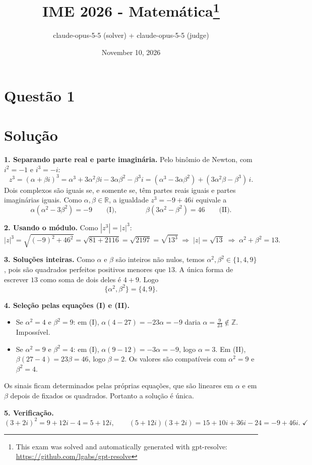 \documentclass{article}%
\title{IME 2026 - Matemática\thanks{This exam was solved and automatically generated with gpt-resolve: \url{https://github.com/lgabs/gpt-resolve}}}%
\author{claude{-}opus{-}5{-}5 (solver) + claude{-}opus{-}5{-}5 (judge)}%
\date{November 10, 2026}%
\begin{document}
%
\normalsize%
\maketitle%
\section*{Questão 1}

\section*{Solução}

\textbf{1. Separando parte real e parte imaginária.} Pelo binômio de Newton, com $i^2=-1$ e $i^3=-i$:
\[
z^3=(\alpha+\beta i)^3=\alpha^3+3\alpha^2\beta i-3\alpha\beta^2-\beta^3 i=(\alpha^3-3\alpha\beta^2)+(3\alpha^2\beta-\beta^3)\,i .
\]
Dois complexos são iguais se, e somente se, têm partes reais iguais e partes imaginárias iguais. Como $\alpha,\beta\in\mathbb{R}$, a igualdade $z^3=-9+46i$ equivale a
\[
\alpha(\alpha^2-3\beta^2)=-9 \qquad \text{(I)}, \qquad\qquad \beta(3\alpha^2-\beta^2)=46 \qquad \text{(II)}.
\]

\textbf{2. Usando o módulo.} Como $|z^3|=|z|^3$:
\[
|z|^3=\sqrt{(-9)^2+46^2}=\sqrt{81+2116}=\sqrt{2197}=\sqrt{13^3}
\;\Longrightarrow\; |z|=\sqrt{13}
\;\Longrightarrow\; \alpha^2+\beta^2=13 .
\]

\textbf{3. Soluções inteiras.} Como $\alpha$ e $\beta$ são inteiros não nulos, temos $\alpha^2,\beta^2\in\{1,4,9\}$, pois são quadrados perfeitos positivos menores que $13$. A única forma de escrever $13$ como soma de dois deles é $4+9$. Logo
\[
\{\alpha^2,\beta^2\}=\{4,9\}.
\]

\textbf{4. Seleção pelas equações (I) e (II).}
\begin{itemize}
\item Se $\alpha^2=4$ e $\beta^2=9$: em (I), $\alpha(4-27)=-23\alpha=-9$ daria $\alpha=\tfrac{9}{23}\notin\mathbb{Z}$. Impossível.
\item Se $\alpha^2=9$ e $\beta^2=4$: em (I), $\alpha(9-12)=-3\alpha=-9$, logo $\alpha=3$. Em (II), $\beta(27-4)=23\beta=46$, logo $\beta=2$. Os valores são compatíveis com $\alpha^2=9$ e $\beta^2=4$.
\end{itemize}
Os sinais ficam determinados pelas próprias equações, que são lineares em $\alpha$ e em $\beta$ depois de fixados os quadrados. Portanto a solução é única.

\textbf{5. Verificação.}
\[
(3+2i)^2=9+12i-4=5+12i,\qquad (5+12i)(3+2i)=15+10i+36i-24=-9+46i. \;\checkmark
\]
\end{document}
